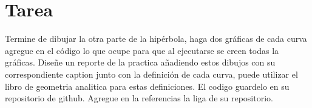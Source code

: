 \documentclass[12pt,a4paper]{article} %
\begin{document}
\section{Tarea}

Termine de dibujar la otra parte de la hipérbola, haga dos gráficas de cada curva agregue en el código lo que ocupe para que al ejecutarse se creen todas la gráficas. Diseñe un reporte de la practica añadiendo estos dibujos con su correspondiente caption junto con la definición de cada curva, puede utilizar el libro de geometria analitica\citep{geometria} para estas definiciones. El codigo guardelo en su repositorio de github. Agregue en la referencias la liga de su repositorio.\citep{repositorio}




\end{document}
